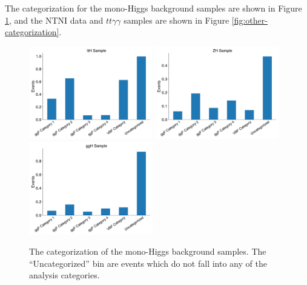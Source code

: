 The categorization for the mono-Higgs background samples are shown in Figure \ref{fig:monoH-categorization}, and the \gls{NTNI} data and $tt\gamma\gamma$ samples are shown in Figure \ref{fig:other-categorization}.

\begin{figure}
    \centering
    \includegraphics[width=0.48\textwidth]{chapters/chapter6_vbf/images/category_breakdown/tth_sample.pdf}
    \includegraphics[width=0.48\textwidth]{chapters/chapter6_vbf/images/category_breakdown/zh_sample.pdf}
    \includegraphics[width=0.48\textwidth]{chapters/chapter6_vbf/images/category_breakdown/ggh_sample.pdf}
    \caption[The categorization of the mono-Higgs samples]{The categorization of the mono-Higgs background samples. The ``Uncategorized'' bin are events which do not fall into any of the analysis categories.
    \label{fig:monoH-categorization}}
\end{figure}

